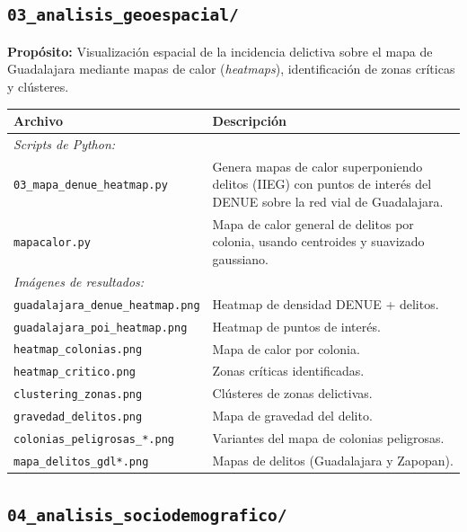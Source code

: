 \documentclass[12pt, a4paper]{article}
\begin{document}
\subsection{\texttt{03\_analisis\_geoespacial/}}

\textbf{Propósito:} Visualización espacial de la incidencia delictiva sobre el mapa de Guadalajara mediante mapas de calor (\textit{heatmaps}), identificación de zonas críticas y clústeres.

\begin{table}[h!]
\centering
\small
\begin{tabular}{p{6cm} p{8cm}}
\toprule
\textbf{Archivo} & \textbf{Descripción} \\
\midrule
\multicolumn{2}{l}{\textit{Scripts de Python:}} \\
\addlinespace
\texttt{03\_mapa\_denue\_heatmap.py} & Genera mapas de calor superponiendo delitos (IIEG) con puntos de interés del DENUE sobre la red vial de Guadalajara. \\
\texttt{mapacalor.py} & Mapa de calor general de delitos por colonia, usando centroides y suavizado gaussiano. \\
\midrule
\multicolumn{2}{l}{\textit{Imágenes de resultados:}} \\
\addlinespace
\texttt{guadalajara\_denue\_heatmap.png} & Heatmap de densidad DENUE + delitos. \\
\texttt{guadalajara\_poi\_heatmap.png} & Heatmap de puntos de interés. \\
\texttt{heatmap\_colonias.png} & Mapa de calor por colonia. \\
\texttt{heatmap\_critico.png} & Zonas críticas identificadas. \\
\texttt{clustering\_zonas.png} & Clústeres de zonas delictivas. \\
\texttt{gravedad\_delitos.png} & Mapa de gravedad del delito. \\
\texttt{colonias\_peligrosas\_*.png} & Variantes del mapa de colonias peligrosas. \\
\texttt{mapa\_delitos\_gdl*.png} & Mapas de delitos (Guadalajara y Zapopan). \\
\bottomrule
\end{tabular}
\end{table}

\subsection{\texttt{04\_analisis\_sociodemografico/}}
\end{document}

